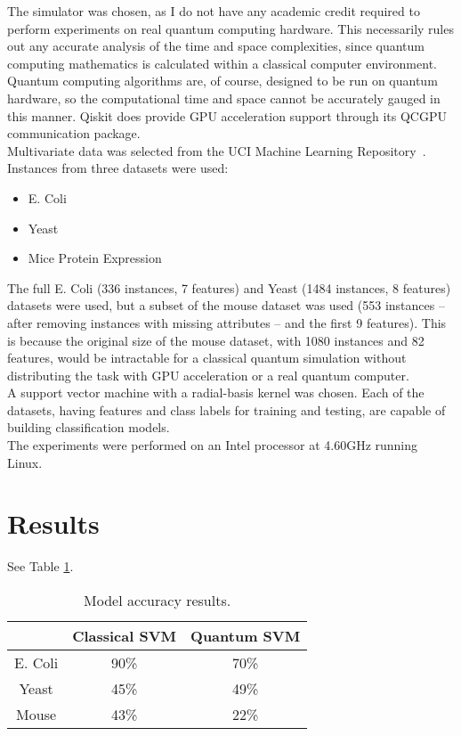 \documentclass{article}
\begin{document}
  The simulator was chosen, as I do not have any academic credit required to perform experiments on real quantum computing hardware. This necessarily rules out any accurate analysis of the time and space complexities, since quantum computing mathematics is calculated within a classical computer environment. Quantum computing algorithms are, of course, designed to be run on quantum hardware, so the computational time and space cannot be accurately gauged in this manner. Qiskit does provide GPU acceleration support through its QCGPU communication package.~\cite{qcgpu} \\

  Multivariate data was selected from the UCI Machine Learning Repository~\cite{mlrepo}. Instances from three datasets were used:

    \begin{itemize}
      \item E. Coli~\cite{ecoli}
      \item Yeast~\cite{yeast}
      \item Mice Protein Expression~\cite{mouse}
    \end{itemize}

  The full E. Coli (336 instances, 7 features) and Yeast (1484 instances, 8 features) datasets were used, but a subset of the mouse dataset was used (553 instances -- after removing instances with missing attributes -- and the first 9 features). This is because the original size of the mouse dataset, with 1080 instances and 82 features, would be intractable for a classical quantum simulation without distributing the task with GPU acceleration or a real quantum computer. \\

  A support vector machine with a radial-basis kernel was chosen. Each of the datasets, having features and class labels for training and testing, are capable of building classification models. \\

  The experiments were performed on an Intel processor at 4.60GHz running Linux.

\section{Results}
    See Table \ref{table:accuracy}.

    \begin{table}[h]
      \centering
      \begin{tabular}{c|c|c|}
      \cline{2-3}
                                    & Classical SVM & Quantum SVM \\ \hline
      \multicolumn{1}{|c|}{E. Coli} & 90\%          & 70\%        \\ \hline
      \multicolumn{1}{|c|}{Yeast}   & 45\%          & 49\%        \\ \hline
      \multicolumn{1}{|c|}{Mouse}   & 43\%          & 22\%        \\ \hline
      \end{tabular}
      \caption{\label{table:accuracy}Model accuracy results.}
    \end{table}
\end{document}
